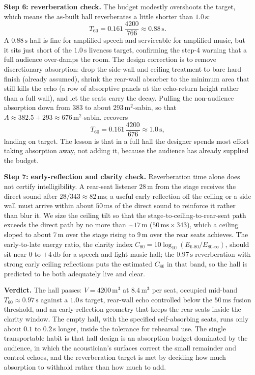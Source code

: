 \textbf{Step 6: reverberation check.} The budget modestly overshoots the
target, which means the as-built hall reverberates a little shorter than
$1.0\,\si{\second}$:
\[
T_{60} = 0.161\,\frac{4200}{766} \approx 0.88\,\si{\second}.
\]
A $0.88\,\si{\second}$ hall is fine for amplified speech and serviceable
for amplified music, but it sits just short of the $1.0\,\si{\second}$
liveness target, confirming the step-4 warning that a full audience
over-damps the room. The design correction is to remove discretionary
absorption: drop the side-wall and ceiling treatment to bare hard finish
(already assumed), shrink the rear-wall absorber to the minimum area that
still kills the echo (a row of absorptive panels at the echo-return height
rather than a full wall), and let the seats carry the decay. Pulling the
non-audience absorption down from $383$ to about
$293\,\si{\meter\squared}$-sabin, so that $A\approx 382.5+293\approx
676\,\si{\meter\squared}$-sabin, recovers
\[
T_{60} = 0.161\,\frac{4200}{676} \approx 1.0\,\si{\second},
\]
landing on target. The lesson is that in a full hall the designer spends
most effort taking absorption away, not adding it, because the audience
has already supplied the budget.

\textbf{Step 7: early-reflection and clarity check.} Reverberation time
alone does not certify intelligibility. A rear-seat listener
$28\,\si{\meter}$ from the stage receives the direct sound after
$28/343\approx 82\,\si{\milli\second}$; a useful early reflection off the
ceiling or a side wall must arrive within about $50\,\si{\milli\second}$
of the direct sound to reinforce it rather than blur it. We size the
ceiling tilt so that the stage-to-ceiling-to-rear-seat path exceeds the
direct path by no more than $\sim 17\,\si{\meter}$
($50\,\si{\milli\second}\times 343$), which a ceiling sloped to about
$7\,\si{\meter}$ over the stage rising to $9\,\si{\meter}$ over the rear
seats achieves. The early-to-late energy ratio, the clarity index
$C_{80}=10\log_{10}(E_{0\text{-}80}/E_{80\text{-}\infty})$, should sit
near $0$ to $+4\,\si{\decibel}$ for a speech-and-light-music hall; the
$0.97\,\si{\second}$ reverberation with strong early ceiling reflections
puts the estimated $C_{80}$ in that band, so the hall is predicted to be
both adequately live and clear.

\textbf{Verdict.} The hall passes: $V=4200\,\si{\meter\cubed}$ at
$8.4\,\si{\meter\cubed}$ per seat, occupied mid-band
$T_{60}\approx 0.97\,\si{\second}$ against a $1.0\,\si{\second}$ target,
rear-wall echo controlled below the $50\,\si{\milli\second}$ fusion
threshold, and an early-reflection geometry that keeps the rear seats
inside the clarity window. The empty hall, with the specified
self-absorbing seats, runs only about $0.1$ to $0.2\,\si{\second}$ longer,
inside the tolerance for rehearsal use. The single transportable habit is
that hall design is an absorption budget dominated by the audience, in
which the acoustician's surfaces correct the small remainder and control
echoes, and the reverberation target is met by deciding how much
absorption to withhold rather than how much to add.

